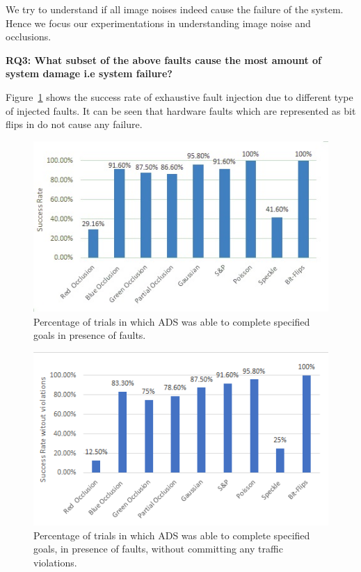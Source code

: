 We try to understand if all image noises indeed cause the failure of the system. Hence we focus our experimentations in understanding image noise and occlusions.

\textbf{RQ3: What subset of the above faults cause the most amount of system damage i.e system failure?}

Figure~\ref{fig:success_rate} shows the success rate of exhaustive fault injection due to different type of injected faults. It can be seen that hardware faults which are represented as bit flips in do not cause any failure.

\begin{figure}
	\vspace{-0.5em}
	\centering
	\includegraphics[scale=0.7]{success_rate}
	\vspace{-0.5em}
	\caption{Percentage of trials in which ADS was able to complete specified goals in presence of faults.}
	\label{fig:success_rate}
	\vspace{-1.5em}
\end{figure}

\begin{figure}  
	\vspace{1.0em}
	\centering
	\includegraphics[scale=0.7]{no_violations}
	\vspace{-0.5em}
	\caption{Percentage of trials in which ADS was able to complete specified goals, in presence of faults, without committing any traffic violations.}
	\label{fig:no_violations}
	\vspace{-1.5em}
\end{figure}





